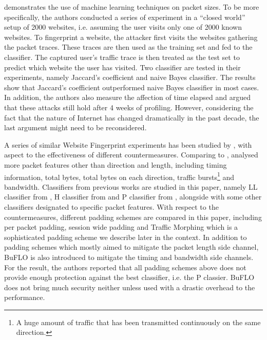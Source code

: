 \cite{WebsiteFingerprint} demonstrates the use of machine learning techniques on packet sizes. To be more specifically, the authors conducted a series of experiment in a ``closed world'' setup of 2000 websites, i.e. assuming the user visits only one of 2000 known websites. To fingerprint a website, the attacker first visits the websites gathering the packet traces. These traces are then used as the training set and fed to the classifier. The captured user's traffic trace is then treated as the test set to predict which website the user has visited. Two classifier are tested in their experiments, namely Jaccard's coefficient and naive Bayes classifier. The results show that Jaccard's coefficient outperformed naive Bayes classifier in most cases. In addition, the authors also measure the affection of time elapsed and argued that these attacks still hold after 4 weeks of profiling. However, considering the fact that the nature of Internet has changed dramatically in the past decade, the last argument might need to be reconsidered.

A series of similar Website Fingerprint experiments has been studied by \cite{Peekaboo}, with aspect to the effectiveness of different countermeasures. Comparing to \cite{WebsiteFingerprint}, \cite{Peekaboo} analysed more packet features other than direction and length, including timing information, total bytes, total bytes on each direction, traffic bursts\footnote{A huge amount of traffic that has been transmitted continuously on the same direction.} and bandwidth. Classifiers from previous works are studied in this paper, namely LL classifier from \cite{WebsiteFingerprint}, H classifier from \cite{HClassifier} and P classifier from \cite{PClassifier}, alongside with some other classifiers designated to specific packet features. With respect to the countermeasures, different padding schemes are compared in this paper, including per packet padding, session wide padding and Traffic Morphing which is a sophisticated padding scheme we describe later in the context. In addition to padding schemes which mostly aimed to mitigate the packet length side channel, BuFLO\cite{Peekaboo} is also introduced to mitigate the timing and bandwidth side channels. For the result, the authors reported that all padding schemes above does not provide enough protection against the best classifier, i.e. the P classier. BuFLO does not bring much security neither unless used with a drastic overhead to the performance.

